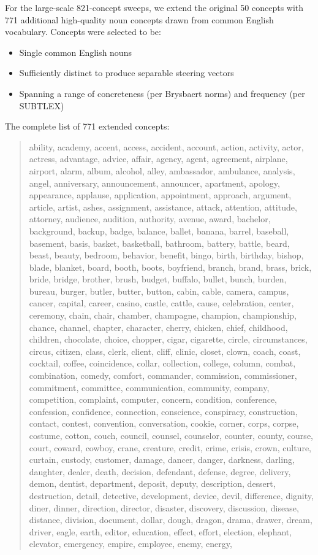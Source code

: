 \documentclass{article}
\begin{document}
For the large-scale 821-concept sweeps, we extend the original 50 concepts with 771 additional high-quality noun concepts drawn from common English vocabulary. Concepts were selected to be:
\begin{itemize}
    \item Single common English nouns
    \item Sufficiently distinct to produce separable steering vectors
    \item Spanning a range of concreteness (per Brysbaert norms) and frequency (per SUBTLEX)
\end{itemize}

\noindent The complete list of 771 extended concepts:

\begin{quote}
\small
ability, academy, accent, access, accident, account, action, activity, actor, actress, advantage, advice, affair, agency, agent, agreement, airplane, airport, alarm, album, alcohol, alley, ambassador, ambulance, analysis, angel, anniversary, announcement, announcer, apartment, apology, appearance, applause, application, appointment, approach, argument, article, artist, ashes, assignment, assistance, attack, attention, attitude, attorney, audience, audition, authority, avenue, award, bachelor, background, backup, badge, balance, ballet, banana, barrel, baseball, basement, basis, basket, basketball, bathroom, battery, battle, beard, beast, beauty, bedroom, behavior, benefit, bingo, birth, birthday, bishop, blade, blanket, board, booth, boots, boyfriend, branch, brand, brass, brick, bride, bridge, brother, brush, budget, buffalo, bullet, bunch, burden, bureau, burger, butler, butter, button, cabin, cable, camera, campus, cancer, capital, career, casino, castle, cattle, cause, celebration, center, ceremony, chain, chair, chamber, champagne, champion, championship, chance, channel, chapter, character, cherry, chicken, chief, childhood, children, chocolate, choice, chopper, cigar, cigarette, circle, circumstances, circus, citizen, class, clerk, client, cliff, clinic, closet, clown, coach, coast, cocktail, coffee, coincidence, collar, collection, college, column, combat, combination, comedy, comfort, commander, commission, commissioner, commitment, committee, communication, community, company, competition, complaint, computer, concern, condition, conference, confession, confidence, connection, conscience, conspiracy, construction, contact, contest, convention, conversation, cookie, corner, corps, corpse, costume, cotton, couch, council, counsel, counselor, counter, county, course, court, coward, cowboy, crane, creature, credit, crime, crisis, crown, culture, curtain, custody, customer, damage, dancer, danger, darkness, darling, daughter, dealer, death, decision, defendant, defense, degree, delivery, demon, dentist, department, deposit, deputy, description, dessert, destruction, detail, detective, development, device, devil, difference, dignity, diner, dinner, direction, director, disaster, discovery, discussion, disease, distance, division, document, dollar, dough, dragon, drama, drawer, dream, driver, eagle, earth, editor, education, effect, effort, election, elephant, elevator, emergency, empire, employee, enemy, energy, 
\end{quote}
\end{document}
